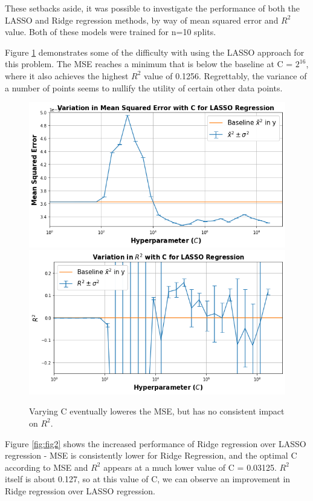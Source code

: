 These setbacks aside, it was possible to investigate the performance of both the LASSO and Ridge regression methods, by way of mean squared error and $R^2$ value. Both of these models were trained for n=10 splits.
\vspace{8pt}

Figure \ref{fig:fig1} demonstrates some of the difficulty with using the LASSO approach for this problem. The MSE reaches a minimum that is below the baseline at C = $2^{16}$, where it also achieves the highest $R^2$ value of 0.1256. Regrettably, the variance of a number of points seems to nullify the utility of certain other data points.

\begin{figure}[!h]
\begin{small}
\centering
\linespread{1.0}
\includegraphics[width=0.8\linewidth]{pics/Lasso_MSE.png}
\includegraphics[width=0.8\linewidth]{pics/Lasso_R2.png}
\caption{Varying C eventually loweres the MSE, but has no consistent impact on $R^2$.}
\label{fig:fig1}
\end{small}
\end{figure}

\vspace{8pt}

Figure \ref{fig:fig2} shows the increased performance of Ridge regression over LASSO regression - MSE is consistently lower for Ridge Regression, and the optimal C according to MSE and $R^2$ appears at a much lower value of C = 0.03125. $R^2$ itself is about 0.127, so at this value of C, we can observe an improvement in Ridge regression over LASSO regression.


